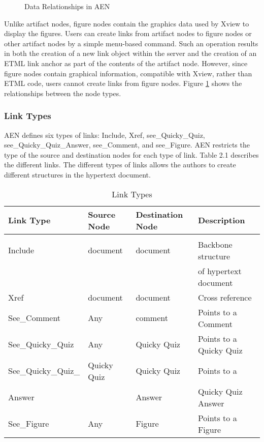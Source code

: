 \begin{figure}[htb]
  \centerline{}
  \caption{Data Relationships in AEN}
  \label{fig:Data}
\end{figure}

Unlike artifact nodes, figure nodes contain the graphics data used by Xview
to display the figures.  Users can create links from artifact nodes to
figure nodes or other artifact nodes by a simple menu-based command.  Such
an operation results in both the creation of a new link object within the
server and the creation of an ETML link anchor as part of the contents of
the artifact node.  However, since figure nodes contain graphical
information, compatible with Xview, rather than ETML code, users cannot
create links from figure nodes.  Figure \ref{fig:Data} shows the
relationships between the node types.

\subsubsection{Link Types}

AEN defines six types of links: Include, Xref,
see\_Quicky\_\-Quiz, see\_\-Quicky\_\-Quiz\_\-Answer, see\_\-Comment, and
see\_Figure.  AEN restricts the type of the source and destination nodes
for each type of link. Table 2.1 describes the different
links.  The different types of links allows the authors to create different
structures in the hypertext document. 

\begin{table}
  \begin{center}
    \caption{Link Types}
    \begin{tabular}{|l|l|l|l|}
      \hline
      Link Type&Source Node&Destination Node&Description\\ \hline \hline&&&\\ 
      Include&document&document&Backbone structure \\
      &&&of hypertext document\\ \hline
      Xref&document&document&Cross reference\\ \hline
      See\_Comment&Any&comment&Points to a Comment\\ \hline
      See\_Quicky\_Quiz&Any&Quicky Quiz&Points to a Quicky Quiz\\ \hline
      See\_Quicky\_Quiz\_&Quicky Quiz&Quicky Quiz&Points to a\\
      Answer&&Answer&Quicky Quiz Answer\\\hline
      See\_Figure&Any&Figure&Points to a Figure\\ \hline
    \end{tabular}
    \label{tab:types}
  \end{center}
\end{table}


